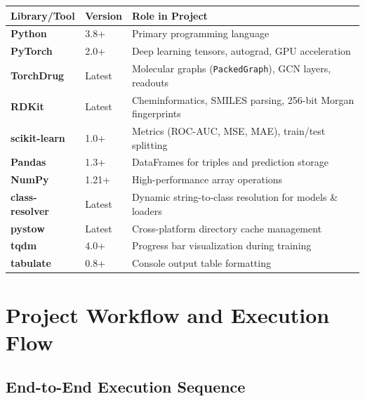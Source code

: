 \documentclass[12pt,a4paper,oneside]{article}
\begin{document}
\begin{longtable}{>{\bfseries}p{3.5cm}p{2.5cm}p{8.5cm}}
\toprule
\textbf{Library/Tool} & \textbf{Version} & \textbf{Role in Project} \\
\midrule\endhead
Python & 3.8+ & Primary programming language \\
PyTorch & 2.0+ & Deep learning tensors, autograd, GPU acceleration \\
TorchDrug & Latest & Molecular graphs (\texttt{PackedGraph}), GCN layers, readouts \\
RDKit & Latest & Cheminformatics, SMILES parsing, 256-bit Morgan fingerprints \\
scikit-learn & 1.0+ & Metrics (ROC-AUC, MSE, MAE), train/test splitting \\
Pandas & 1.3+ & DataFrames for triples and prediction storage \\
NumPy & 1.21+ & High-performance array operations \\
class-resolver & Latest & Dynamic string-to-class resolution for models \& loaders \\
pystow & Latest & Cross-platform directory cache management \\
tqdm & 4.0+ & Progress bar visualization during training \\
tabulate & 0.8+ & Console output table formatting \\
\bottomrule
\end{longtable}

\section{Project Workflow and Execution Flow}\label{sec:workflow}

\subsection{End-to-End Execution Sequence}
\end{document}
